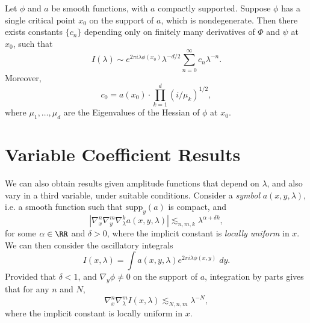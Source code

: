 \begin{theorem}
  Let $\phi$ and $a$ be smooth functions, with $a$ compactly supported. Suppose $\phi$ has a single critical point $x_0$ on the support of $a$, which is nondegenerate. Then there exists constants $\{ c_n \}$ depending only on finitely many derivatives of $\Phi$ and $\psi$ at $x_0$, such that
  \[ I(\lambda) \sim e^{2 \pi i \lambda \phi(x_0)} \lambda^{-d/2} \sum_{n = 0}^\infty c_n \lambda^{-n}. \]
  Moreover,
  \[ c_0 = a(x_0) \cdot \prod_{k = 1}^d (i/\mu_k)^{1/2}, \]
  where $\mu_1,\dots,\mu_d$ are the Eigenvalues of the Hessian of $\phi$ at $x_0$.
\end{theorem}

\section{Variable Coefficient Results}

We can also obtain results given amplitude functions that depend on $\lambda$, and also vary in a third variable, under suitable conditions. Consider a \emph{symbol} $a(x,y,\lambda)$, i.e. a smooth function such that $\text{supp}_y(a)$ is compact, and
%
\[ \left| \nabla_x^n \nabla_y^m \nabla_\lambda^k a(x,y,\lambda) \right| \lesssim_{n,m,k} \lambda^{\alpha + \delta k}, \]
%
for some $\alpha \in \RR$ and $\delta > 0$, where the implicit constant is \emph{locally uniform} in $x$. We can then consider the oscillatory integrals
%
\[ I(x,\lambda) = \int a(x,y,\lambda) e^{2 \pi i \lambda \phi(x,y)}\; dy. \]
%
Provided that $\delta < 1$, and $\nabla_y \phi \neq 0$ on the support of $a$, integration by parts gives that for any $n$ and $N$,
%
\[ \nabla_x^n \nabla_\lambda^m I (x,\lambda) \lesssim_{N,n,m} \lambda^{-N}, \]
%
where the implicit constant is locally uniform in $x$.

